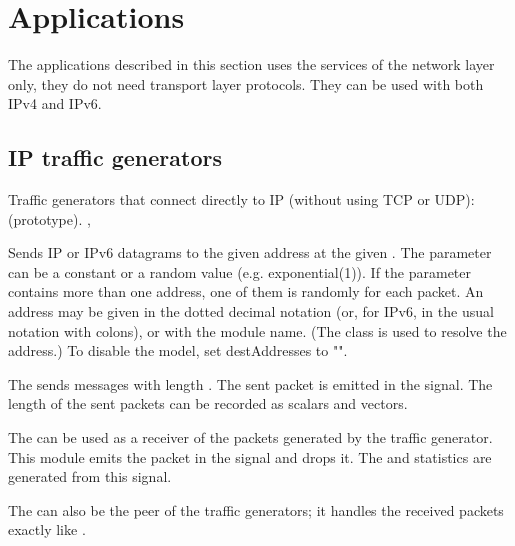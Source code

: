 


\section{Applications}

The applications described in this section uses the services of the network
layer only, they do not need transport layer protocols.
They can be used with both IPv4 and IPv6.

\subsection{IP traffic generators}

Traffic generators that connect directly to IP (without using TCP or UDP):
 (prototype).
 ,

Sends IP or IPv6 datagrams to the given address at the given .
The  parameter can be a constant or a random value (e.g. exponential(1)).
If the  parameter contains more than one address, one
of them is randomly for each packet. An address may be given in the
dotted decimal notation (or, for IPv6, in the usual notation with colons),
or with the module name. (The  class is used to resolve
the address.) To disable the model, set destAddresses to "".

The  sends messages with length .
The sent packet is emitted in the  signal.
The length of the sent packets can be recorded as scalars and vectors.


The  can be used as a receiver of the packets
generated by the traffic generator. This module emits the packet
in the  signal and drops it. The 
and  statistics are generated from this signal.

The  can also be the peer of the traffic generators;
it handles the received packets exactly like .

